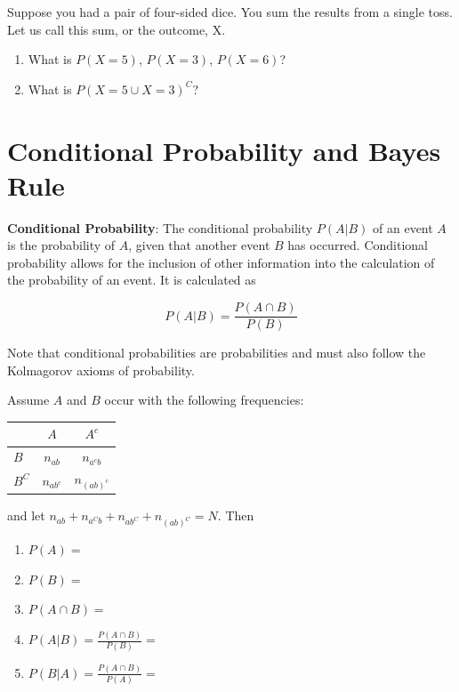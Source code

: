 \documentclass[]{book}
\providecommand{\tightlist}{%
  \setlength{\itemsep}{0pt}\setlength{\parskip}{0pt}}
\theoremstyle{definition}
\theoremstyle{definition}
\theoremstyle{definition}
\theoremstyle{remark}
\let\BeginKnitrBlock\begin \let\EndKnitrBlock\end
\begin{document}
\BeginKnitrBlock{exercise}[Probability]
\protect\hypertarget{exr:prob1}{}{\label{exr:prob1} {} } Suppose you had a pair of four-sided dice. You sum the results
from a single toss. Let us call this sum, or the outcome, X.

\begin{enumerate}
\def\labelenumi{\arabic{enumi}.}
\item
  What is \(P(X = 5)\), \(P(X = 3)\), \(P(X = 6)\)?
\item
  What is \(P(X=5 \cup X = 3)^C\)?
\end{enumerate}
\EndKnitrBlock{exercise}

\section{Conditional Probability and Bayes
Rule}\label{conditional-probability-and-bayes-rule}

\textbf{Conditional Probability}: The conditional probability \(P(A|B)\)
of an event \(A\) is the probability of \(A\), given that another event
\(B\) has occurred. Conditional probability allows for the inclusion of
other information into the calculation of the probability of an event.
It is calculated as

\[P(A|B)=\frac{P(A\cap B)}{P(B)}\]

Note that conditional probabilities are probabilities and must also
follow the Kolmagorov axioms of probability.

\BeginKnitrBlock{example}[Conditional Probability 1]
\protect\hypertarget{exm:condprobexm1}{}{\label{exm:condprobexm1}
{} } Assume \(A\) and \(B\)
occur with the following frequencies: \(\quad\)

\begin{longtable}[]{@{}lcc@{}}
\toprule
& \(A\) & \(A^c\)\tabularnewline
\midrule
\endhead
\(B\) & \(n_{ab}\) & \(n_{a^cb}\)\tabularnewline
\(B^C\) & \(n_{ab^c}\) & \(n_{(ab)^c}\)\tabularnewline
\bottomrule
\end{longtable}

and let \(n_{ab}+n_{a^Cb}+n_{ab^C}+n_{(ab)^C}=N\). Then

\begin{enumerate}
\def\labelenumi{\arabic{enumi}.}
\tightlist
\item
  \(P(A)=\)
\item
  \(P(B)=\)
\item
  \(P(A\cap B)=\)
\item
  \(P(A|B)= \frac{P(A\cap B)}{P(B)}=\)
\item
  \(P(B|A)= \frac{P(A\cap B)}{P(A)}=\)
\end{enumerate}
\EndKnitrBlock{example}
\end{document}
